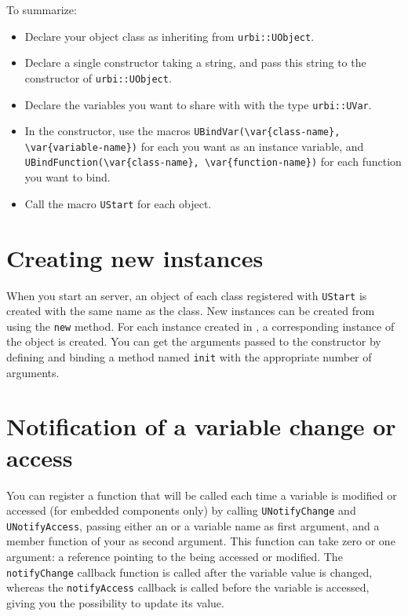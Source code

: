 To summarize:

\begin{itemize}
\item Declare your object class as inheriting from
  \lstinline{urbi::UObject}.
\item Declare a single constructor taking a string, and pass this
  string to the constructor of \lstinline{urbi::UObject}.
\item Declare the variables you want to share with \urbi with the type
  \lstinline{urbi::UVar}.
\item In the constructor, use the macros
  \lstinline|UBindVar(\var{class-name}, \var{variable-name})|
  for each \UVar you want as an instance variable, and
  \lstinline|UBindFunction(\var{class-name}, \var{function-name})| for
  each function you want to bind.
\item Call the macro \lstinline{UStart} for each object.
\end{itemize}

\section{Creating new instances}

When you start an \urbi server, an object of each class registered
with \lstinline{UStart} is created with the same name as the
class. New instances can be created from \urbi using the
\lstinline|new| method. For each instance created in \urbi, a
corresponding instance of the \Cxx object is created. You can get the
arguments passed to the constructor by defining and binding a method
named \lstinline|init| with the appropriate number of arguments.

\section{Notification of a variable change or access}

You can register a function that will be called each time a variable
is modified or accessed (for embedded components only) by calling
\lstinline{UNotifyChange} and \lstinline{UNotifyAccess}, passing
either an \UVar or a variable name as first argument, and a member
function of your \UObject as second argument. This function can take
zero or one argument: a \UVar reference pointing to the \UVar being
accessed or modified. The \lstinline{notifyChange} callback function
is called after the variable value is changed, whereas the
\lstinline{notifyAccess} callback is called before the variable is
accessed, giving you the possibility to update its value.

